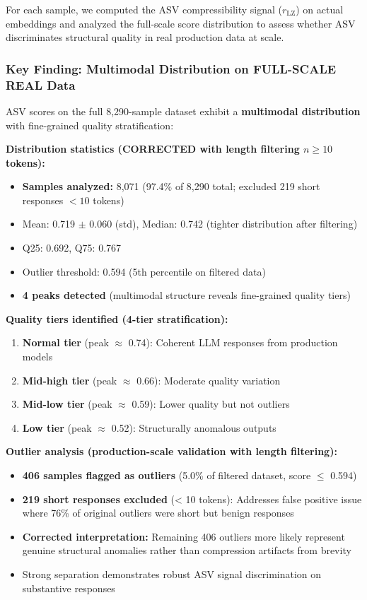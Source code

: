 \documentclass[11pt]{article}
\begin{document}
For each sample, we computed the ASV compressibility signal ($r_{\text{LZ}}$) on actual embeddings and analyzed the full-scale score distribution to assess whether ASV discriminates structural quality in real production data at scale.

\subsubsection{Key Finding: Multimodal Distribution on FULL-SCALE REAL Data}

ASV scores on the full 8,290-sample dataset exhibit a \textbf{multimodal distribution} with fine-grained quality stratification:

\textbf{Distribution statistics (CORRECTED with length filtering $n \geq 10$ tokens):}
\begin{itemize}
\item \textbf{Samples analyzed:} 8,071 (97.4\% of 8,290 total; excluded 219 short responses $< 10$ tokens)
\item Mean: 0.719 $\pm$ 0.060 (std), Median: 0.742 (tighter distribution after filtering)
\item Q25: 0.692, Q75: 0.767
\item Outlier threshold: 0.594 (5th percentile on filtered data)
\item \textbf{4 peaks detected} (multimodal structure reveals fine-grained quality tiers)
\end{itemize}

\textbf{Quality tiers identified (4-tier stratification):}
\begin{enumerate}
\item \textbf{Normal tier} (peak $\approx$ 0.74): Coherent LLM responses from production models
\item \textbf{Mid-high tier} (peak $\approx$ 0.66): Moderate quality variation
\item \textbf{Mid-low tier} (peak $\approx$ 0.59): Lower quality but not outliers
\item \textbf{Low tier} (peak $\approx$ 0.52): Structurally anomalous outputs
\end{enumerate}

\textbf{Outlier analysis (production-scale validation with length filtering):}
\begin{itemize}
\item \textbf{406 samples flagged as outliers} (5.0\% of filtered dataset, score $\le$ 0.594)
\item \textbf{219 short responses excluded} (< 10 tokens): Addresses false positive issue where 76\% of original outliers were short but benign responses
\item \textbf{Corrected interpretation:} Remaining 406 outliers more likely represent genuine structural anomalies rather than compression artifacts from brevity
\item Strong separation demonstrates robust ASV signal discrimination on substantive responses
\end{itemize}
\end{document}
